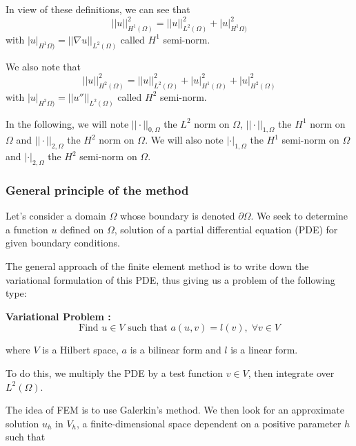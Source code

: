 \begin{Rem}
	In view of these definitions, we can see that
	\begin{equation*}
		||u||^2_{H^1(\Omega)}=||u||^2_{L^2(\Omega)}+|u|^2_{H^1\Omega)}
	\end{equation*}
	with $|u|_{H^1\Omega)}=||\nabla u||_{L^2(\Omega)}$ called $H^1$ semi-norm.
	
	We also note that
	\begin{equation*}
		||u||^2_{H^2(\Omega)}=||u||^2_{L^2(\Omega)}+|u|^2_{H^1(\Omega)}+|u|^2_{H^2(\Omega)}
	\end{equation*}
	with $|u|_{H^2\Omega)}=||u''||_{L^2(\Omega)}$ called $H^2$ semi-norm.
\end{Rem}

\begin{Rem}
	In the following, we will note $||\cdot||_{0,\Omega}$ the $L^2$ norm on $\Omega$, $||\cdot||_{1,\Omega}$ the $H^1$ norm on $\Omega$ and $||\cdot||_{2,\Omega}$ the $H^2$ norm on $\Omega$.
	We will also note $|\cdot|_{1,\Omega}$ the $H^1$ semi-norm on $\Omega$ and $|\cdot|_{2,\Omega}$ the $H^2$ semi-norm on $\Omega$.
\end{Rem}

\subsubsection{General principle of the method} \label{FEMs.FEM.principle}

Let's consider a domain $\Omega$ whose boundary is denoted $\partial\Omega$. We seek to determine a function $u$ defined on $\Omega$, solution of a partial differential equation (PDE) for given boundary conditions.

The general approach of the finite element method is to write down the variational formulation of this PDE, thus giving us a problem of the following type:

\textbf{Variational Problem :}
\begin{equation*}
	\text{Find } u\in V \text{ such that } a(u,v)=l(v), \;\forall v\in V
\end{equation*}

where $V$ is a Hilbert space, $a$ is a bilinear form and $l$ is a linear form.

To do this, we multiply the PDE by a test function $v\in V$, then integrate over $L^2(\Omega)$. 

The idea of FEM is to use Galerkin's method. We then look for an approximate solution $u_h$ in $V_h$, a finite-dimensional space dependent on a positive parameter $h$ such that

